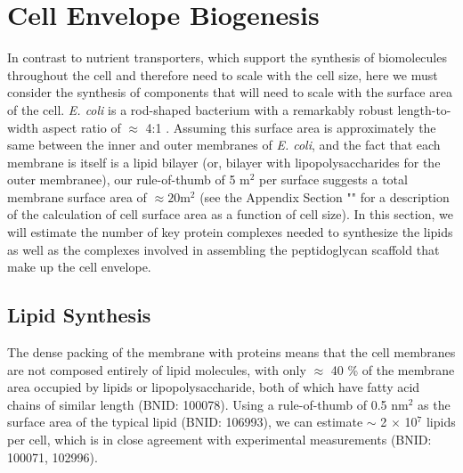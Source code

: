 \section{Cell Envelope Biogenesis}
In contrast to nutrient transporters, which support the synthesis of
biomolecules throughout the cell and therefore need to scale with the cell
size, here we must consider the synthesis of components that will need to
scale with the surface area of the cell. \textit{E. coli} is a rod-shaped
bacterium with a remarkably robust length-to-width aspect ratio of $\approx$
4:1 \citep{harris2018, ojkic2019}. Assuming this surface area is
approximately the same between the inner and outer membranes of \textit{E.
coli}, and the fact that each membrane is itself is a lipid bilayer (or,
bilayer with lipopolysaccharides for the outer membranee), our rule-of-thumb
of 5 \textmu m$^2$ per surface suggests a total membrane surface area of
$\approx 20 $\textmu m$^2$ (see the Appendix Section
"" for a description of the calculation of cell
surface area as a function of cell size). In this section, we will estimate
the number of key protein complexes needed to synthesize the lipids as well
as the complexes involved in assembling the peptidoglycan scaffold that make
up the cell envelope.

\subsection{Lipid Synthesis}
The dense packing of the membrane with proteins means that the cell membranes
are not composed entirely of lipid molecules, with only $\approx$ 40 \% of the
membrane area occupied by lipids or lipopolysaccharide, both of which have fatty 
acid chains of similar length (BNID: 100078). Using a rule-of-thumb of 0.5
nm$^2$ as the surface area of the typical lipid (BNID: 106993), we can
estimate $\sim$ 2 $\times$ 10$^7$ lipids per cell, which is in close
agreement with experimental measurements (BNID: 100071, 102996).

